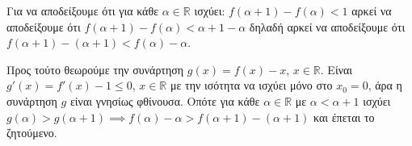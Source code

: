 Για να αποδείξουμε ότι για κάθε $\alpha \in \mathbb{R}$ ισχύει: $f(\alpha+1)-f(\alpha)<1$ αρκεί να αποδείξουμε ότι $f(\alpha+1)-f(\alpha)<\alpha+1-\alpha$ δηλαδή αρκεί να αποδείξουμε ότι $f(\alpha+1)-(\alpha+1)<f(\alpha)-\alpha$.

Προς τούτο θεωρούμε την συνάρτηση $g(x)=f(x)-x$, $x \in \mathbb{R}$. Είναι $g'(x)=f'(x)-1 \leq 0$, $x \in \mathbb{R}$ με την ισότητα να ισχύει μόνο στο $x_0=0$, άρα η συνάρτηση $g$ είναι γνησίως φθίνουσα. Οπότε για κάθε $\alpha \in \mathbb{R}$ με $\alpha < \alpha+1$ ισχύει $g(\alpha)>g(\alpha+1) \implies f(\alpha)-\alpha > f(\alpha+1)-(\alpha+1)$ και έπεται το ζητούμενο.